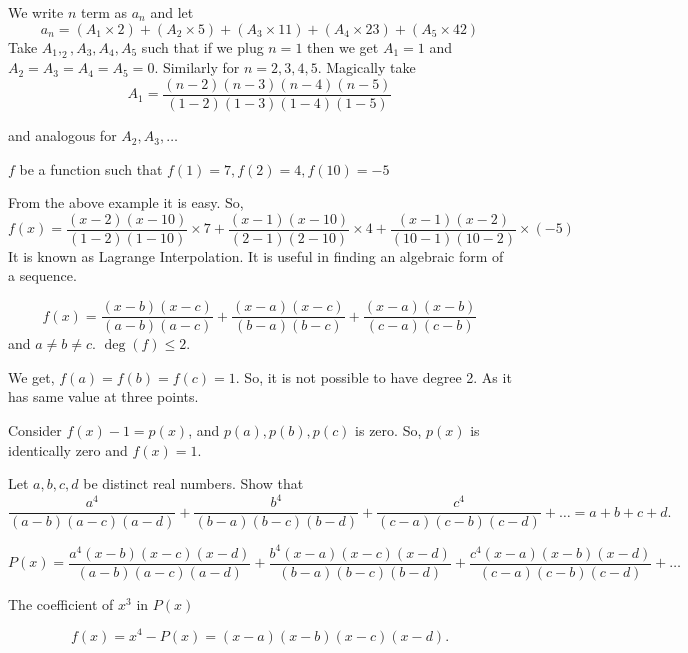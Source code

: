 We write $n$ term as $a_n$ and let \[a_n=(A_1 \times 2) + (A_2\times 5) + (A_3 \times 11) + (A_4 \times 23) + (A_5 \times 42)\]
Take $A_1, _2, A_3, A_4, A_5$ such that if we plug $n=1$ then we get $A_1=1$ and $A_2=A_3=A_4=A_5=0$. Similarly for $n=2,3,4,5$.
Magically take \[A_1=\frac{(n-2)(n-3)(n-4)(n-5)}{(1-2)(1-3)(1-4)(1-5)}\]

and analogous for $A_2, A_3 ,\ldots$

\begin{example}
$f$ be a function such that $f(1)=7, f(2)=4, f(10)=-5$
\end{example} 
From the above example it is easy. 
So,
\[f(x)=\frac{(x-2)(x-10)}{(1-2)(1-10)} \times 7 + \frac{(x-1)(x-10)}{(2-1)(2-10)} \times 4 + \frac{(x-1)(x-2)}{(10-1)(10-2)} \times (-5)\]
It is known as Lagrange Interpolation.
It is useful in finding an algebraic form of a sequence.

\begin{example}
\[f(x)=\frac{(x-b)(x-c)}{(a-b)(a-c)} + \frac{(x-a)(x-c)}{(b-a)(b-c)} + \frac{(x-a)(x-b)}{(c-a)(c-b)}\]
and $a\neq b \neq c$.
$\deg(f)\le 2$.
\end{example}

We get, $f(a)=f(b)=f(c)=1$. So, it is not possible to have degree 2. As it has same value at three points.

Consider $f(x)-1=p(x)$, and $p(a), p(b), p(c)$ is zero. So, $p(x)$ is identically zero and $f(x)=1$.

\begin{example}
Let $a,b,c,d$ be distinct real numbers. Show that \[\frac{a^4}{(a-b)(a-c)(a-d)}+\frac{b^4}{(b-a)(b-c)(b-d)}+\frac{c^4}{(c-a)(c-b)(c-d)}+\ldots=a+b+c+d.\]
\end{example}
\[P(x)=\frac{a^4(x-b)(x-c)(x-d)}{(a-b)(a-c)(a-d)}+\frac{b^4(x-a)(x-c)(x-d)}{(b-a)(b-c)(b-d)}+\frac{c^4(x-a)(x-b)(x-d)}{(c-a)(c-b)(c-d)}+\ldots\]


The coefficient of $x^3$ in $P(x)$ 

\[f(x)=x^4-P(x)=(x-a)(x-b)(x-c)(x-d).\]

